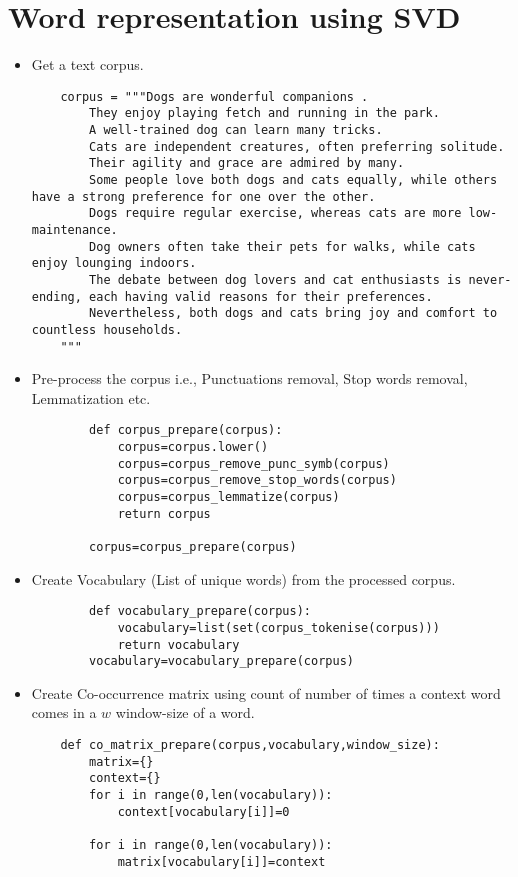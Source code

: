 \documentclass{book}
\begin{document}
\section{Word representation using SVD}
\begin{itemize}
	\item Get a text corpus.
	\subitem
	\begin{verbatim}
	corpus = """Dogs are wonderful companions . 
		They enjoy playing fetch and running in the park.
		A well-trained dog can learn many tricks. 
		Cats are independent creatures, often preferring solitude. 
		Their agility and grace are admired by many. 
		Some people love both dogs and cats equally, while others have a strong preference for one over the other. 
		Dogs require regular exercise, whereas cats are more low-maintenance. 
		Dog owners often take their pets for walks, while cats enjoy lounging indoors. 
		The debate between dog lovers and cat enthusiasts is never-ending, each having valid reasons for their preferences. 
		Nevertheless, both dogs and cats bring joy and comfort to countless households.
	"""

	\end{verbatim} 
	\item Pre-process the corpus i.e., Punctuations removal, Stop words removal, Lemmatization etc.
	\subitem
	\begin{verbatim}
		def corpus_prepare(corpus):
			corpus=corpus.lower()
			corpus=corpus_remove_punc_symb(corpus)
			corpus=corpus_remove_stop_words(corpus)
			corpus=corpus_lemmatize(corpus)
			return corpus
	  
		corpus=corpus_prepare(corpus)
	\end{verbatim} 
	\item Create Vocabulary (List of unique words) from the processed corpus.
	\subitem \begin{verbatim}
		def vocabulary_prepare(corpus):
			vocabulary=list(set(corpus_tokenise(corpus)))
			return vocabulary
		vocabulary=vocabulary_prepare(corpus)
	\end{verbatim}
	\item Create Co-occurrence matrix using count of number of times a context word comes in a $w$ window-size of a word. 
	\subitem \begin{verbatim}
	def co_matrix_prepare(corpus,vocabulary,window_size):
		matrix={}
		context={}
		for i in range(0,len(vocabulary)):
			context[vocabulary[i]]=0
		
		for i in range(0,len(vocabulary)):
			matrix[vocabulary[i]]=context
		

\end{verbatim}
\end{itemize}
\end{document}
